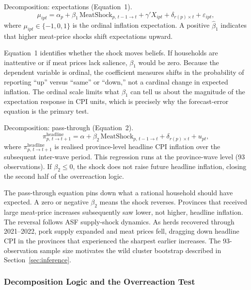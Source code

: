 Decomposition: expectations (Equation~1).
\begin{equation}\label{eq:eq1}
  \mu_{ipt}
  = \alpha_p
  + \beta_1\,\mathrm{MeatShock}_{p,\,t-1\to t}
  + \gamma' X_{ipt}
  + \delta_{r(p)\times t}
  + \varepsilon_{ipt},
\end{equation}
where $\mu_{ipt} \in \{-1,0,1\}$ is the ordinal inflation
expectation.
A positive $\hat{\beta}_1$ indicates that higher meat-price
shocks shift expectations upward.

Equation~1 identifies whether the shock moves beliefs.
If households are inattentive or if meat prices lack
salience, $\beta_1$ would be zero.
Because the dependent variable is ordinal, the coefficient
measures shifts in the probability of reporting ``up'' versus
``same'' or ``down,'' not a cardinal change in expected
inflation.
The ordinal scale limits what $\beta_1$ can tell us about the
magnitude of the expectation response in CPI units, which is
precisely why the forecast-error equation is the primary test.

Decomposition: pass-through (Equation~2).
\begin{equation}\label{eq:eq2}
  \pi^{\mathrm{headline}}_{p,\,t\to t+1}
  = \alpha
  + \beta_2\,\mathrm{MeatShock}_{p,\,t-1\to t}
  + \delta_{r(p)\times t}
  + u_{pt},
\end{equation}
where $\pi^{\mathrm{headline}}_{p,\,t\to t+1}$ is realised
province-level headline CPI inflation over the subsequent
inter-wave period.
This regression runs at the province-wave level (93 observations).
If $\beta_2 \leq 0$, the shock does not raise future headline
inflation, closing the second half of the overreaction logic.

The pass-through equation pins down what a rational household
should have expected.
A zero or negative $\beta_2$ means the shock reverses. Provinces
that received large meat-price increases subsequently saw lower,
not higher, headline inflation.
The reversal follows ASF supply-shock dynamics.
As herds recovered through 2021--2022, pork supply expanded and
meat prices fell, dragging down headline CPI in the provinces
that experienced the sharpest earlier increases.
The 93-observation sample size motivates the wild cluster
bootstrap described in Section~\ref{sec:inference}.

\subsubsection{Decomposition Logic and the Overreaction Test}%
\label{sec:overreaction_decomposition}

